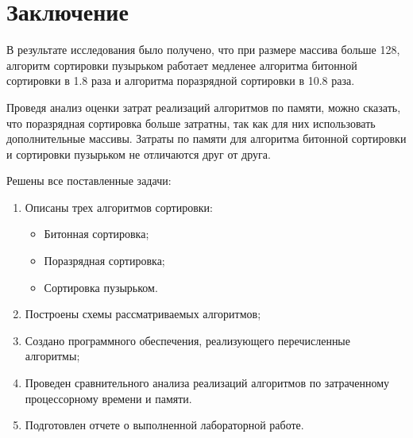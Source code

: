\chapter*{Заключение}

В результате исследования было получено, что при размере массива больше 128, алгоритм сортировки пузырьком работает медленее алгоритма битонной сортировки в 1.8 раза и алгоритма поразрядной сортировки в 10.8 раза.

Проведя анализ оценки затрат реализаций алгоритмов по памяти, можно сказать, что поразрядная сортировка больше затратны, так как для них использовать дополнительные массивы.
Затраты по памяти для алгоритма битонной сортировки и сортировки пузырьком не отличаются друг от друга.

Решены все поставленные задачи:
\begin{enumerate}[label={\arabic*)}]
	\item Описаны трех алгоритмов сортировки:
	\begin{itemize}
		\item Битонная сортировка;
		\item Поразрядная сортировка;
		\item Сортировка пузырьком.
	\end{itemize}
	\item Построены схемы рассматриваемых алгоритмов;
	\item Создано программного обеспечения, реализующего перечисленные алгоритмы;
	\item Проведен сравнительного анализа реализаций алгоритмов по затраченному процессорному времени и памяти.
	\item Подготовлен отчете о выполненной лабораторной работе.
\end{enumerate}

